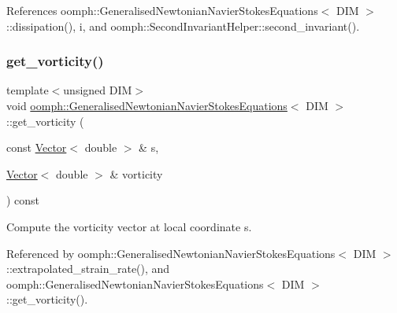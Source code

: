 References oomph\+::\+Generalised\+Newtonian\+Navier\+Stokes\+Equations$<$ D\+I\+M $>$\+::dissipation(), i, and oomph\+::\+Second\+Invariant\+Helper\+::second\+\_\+invariant().

\mbox{\label{classoomph_1_1GeneralisedNewtonianNavierStokesEquations_a85033235e0c4b2ce0b4ac00d8223d7cc}} 
\subsubsection{\texorpdfstring{get\+\_\+vorticity()}{get\_vorticity()}\hspace{0.1cm}{\footnotesize\ttfamily [1/3]}}
{\footnotesize\ttfamily template$<$unsigned D\+IM$>$ \\
void \hyperlink{classoomph_1_1GeneralisedNewtonianNavierStokesEquations}{oomph\+::\+Generalised\+Newtonian\+Navier\+Stokes\+Equations}$<$ D\+IM $>$\+::get\+\_\+vorticity (\begin{DoxyParamCaption}\item[{const \hyperlink{classoomph_1_1Vector}{Vector}$<$ double $>$ \&}]{s,  }\item[{\hyperlink{classoomph_1_1Vector}{Vector}$<$ double $>$ \&}]{vorticity }\end{DoxyParamCaption}) const}



Compute the vorticity vector at local coordinate s. 



Referenced by oomph\+::\+Generalised\+Newtonian\+Navier\+Stokes\+Equations$<$ D\+I\+M $>$\+::extrapolated\+\_\+strain\+\_\+rate(), and oomph\+::\+Generalised\+Newtonian\+Navier\+Stokes\+Equations$<$ D\+I\+M $>$\+::get\+\_\+vorticity().

\mbox{\label{classoomph_1_1GeneralisedNewtonianNavierStokesEquations_a64121c8f382640b7a1dcf1f71770f926}} 
